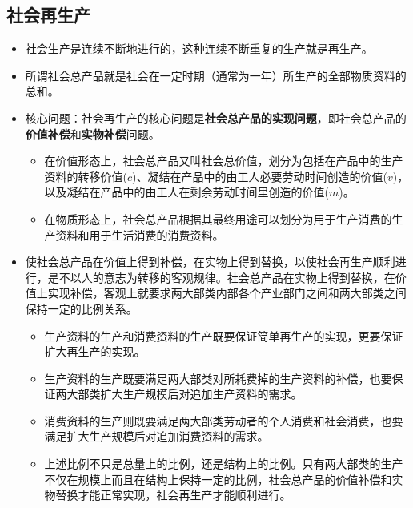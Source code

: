 \documentclass[12pt,openany]{ctexbook}
\begin{document}
\subsection{社会再生产}
\begin{mdquote}
\begin{itemize}
  \item 社会生产是连续不断地进行的，这种连续不断重复的生产就是再生产。
  \item 所谓社会总产品就是社会在一定时期（通常为一年）所生产的全部物质资料的总和。
\end{itemize}
\end{mdquote}
\begin{itemize}
  \item 核心问题：社会再生产的核心问题是\textbf{社会总产品的实现问题}，即社会总产品的\textbf{价值补偿}和\textbf{实物补偿}问题。
\begin{itemize}
  \item 在价值形态上，社会总产品又叫社会总价值，划分为包括在产品中的生产资料的转移价值($c$)、凝结在产品中的由工人必要劳动时间创造的价值($v$)，以及凝结在产品中的由工人在剩余劳动时间里创造的价值($m$)。
  \item 在物质形态上，社会总产品根据其最终用途可以划分为用于生产消费的生产资料和用于生活消费的消费资料。
\end{itemize}
  \item 使社会总产品在价值上得到补偿，在实物上得到替换，以使社会再生产顺利进行，是不以人的意志为转移的客观规律。社会总产品在实物上得到替换，在价值上实现补偿，客观上就要求两大部类内部各个产业部门之间和两大部类之间保持一定的比例关系。
\begin{itemize}
  \item 生产资料的生产和消费资料的生产既要保证简单再生产的实现，更要保证扩大再生产的实现。
  \item 生产资料的生产既要满足两大部类对所耗费掉的生产资料的补偿，也要保证两大部类扩大生产规模后对追加生产资料的需求。
  \item 消费资料的生产则既要满足两大部类劳动者的个人消费和社会消费，也要满足扩大生产规模后对追加消费资料的需求。
  \item 上述比例不只是总量上的比例，还是结构上的比例。只有两大部类的生产不仅在规模上而且在结构上保持一定的比例，社会总产品的价值补偿和实物替换才能正常实现，社会再生产才能顺利进行。
\end{itemize}
\end{itemize}
\end{document}
